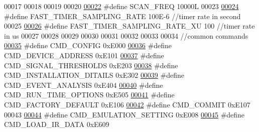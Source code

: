 \begin{DoxyCode}
00017 
00018 
00019 
00020 
\hypertarget{a00086_source_l00022}{}\hyperlink{a00086_a8127170b687c1f67a968886c128e76e4}{00022} \textcolor{preprocessor}{#define SCAN\_FREQ                                       10000L}
00023 
\hypertarget{a00086_source_l00024}{}\hyperlink{a00086_a3a4dcb8af26a561d90607a41a3745806}{00024} \textcolor{preprocessor}{#define FAST\_TIMER\_SAMPLING\_RATE                        100E-6        //timer rate in second}
00025 
\hypertarget{a00086_source_l00026}{}\hyperlink{a00086_a87ea9a0eaa474d8b8f672cfa5cbb091f}{00026} \textcolor{preprocessor}{#define FAST\_TIMER\_SAMPLING\_RATE\_XU                     100           //timer rate in us}
00027 
00028 
00029 
00030 
00031 
00032 
00033 
00034 \textcolor{comment}{//common commands}
\hypertarget{a00086_source_l00035}{}\hyperlink{a00086_aa87bfa4fccf7f7a4fc45afb1966a655f}{00035} \textcolor{preprocessor}{#define CMD\_CONFIG                                              0xE000}
\hypertarget{a00086_source_l00036}{}\hyperlink{a00086_a7c6a5f4023cb02d02f2ded23147be425}{00036} \textcolor{preprocessor}{#define CMD\_DEVICE\_ADDRESS                                      0xE101}
\hypertarget{a00086_source_l00037}{}\hyperlink{a00086_ac361dc1b32c1036394be0fd7de1182ca}{00037} \textcolor{preprocessor}{#define CMD\_SIGNAL\_THRESHOLDS                                   0xE203}
\hypertarget{a00086_source_l00038}{}\hyperlink{a00086_af91ff280feea1f52e3bdd7f0f556d153}{00038} \textcolor{preprocessor}{#define CMD\_INSTALLATION\_DITAILS                                0xE302}
\hypertarget{a00086_source_l00039}{}\hyperlink{a00086_a3a15793e3ab7817f2429edf04de693a0}{00039} \textcolor{preprocessor}{#define CMD\_EVENT\_ANALYSIS                                      0xE404}
\hypertarget{a00086_source_l00040}{}\hyperlink{a00086_a1d8673a7ca545f3e382fc538f543ab72}{00040} \textcolor{preprocessor}{#define CMD\_RUN\_TIME\_OPTIONS                                    0xE505}
\hypertarget{a00086_source_l00041}{}\hyperlink{a00086_a8ad7dae51114833acbb665d703d8ffeb}{00041} \textcolor{preprocessor}{#define CMD\_FACTORY\_DEFAULT                                     0xE106}
\hypertarget{a00086_source_l00042}{}\hyperlink{a00086_a7df85bf97a6a032220d7a71c78be5206}{00042} \textcolor{preprocessor}{#define CMD\_COMMIT                                              0xE107}
00043 
\hypertarget{a00086_source_l00044}{}\hyperlink{a00086_a230386ac00f9c01793857101e1680324}{00044} \textcolor{preprocessor}{#define CMD\_EMULATION\_SETTING                                   0xE008}
\hypertarget{a00086_source_l00045}{}\hyperlink{a00086_a8c7ce698ee79d20e30eb0ac08f0d9abc}{00045} \textcolor{preprocessor}{#define CMD\_LOAD\_IR\_DATA                                        0xE609}

\end{DoxyCode}

